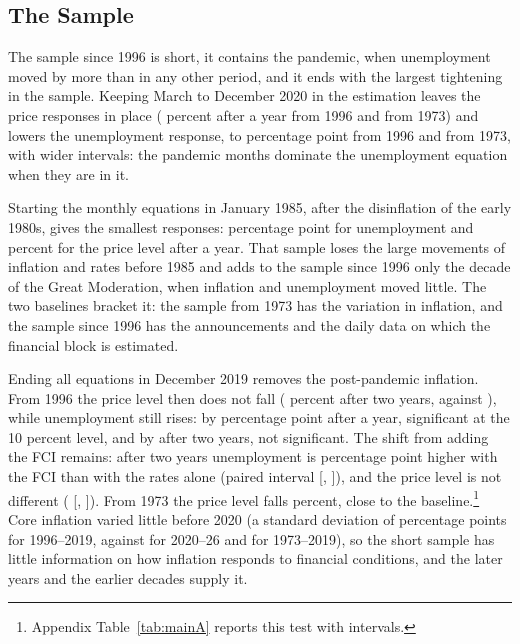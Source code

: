 \documentclass[11pt]{article}
\begin{document}
\subsection{The Sample}\label{sec:recent}
The sample since 1996 is short, it contains the pandemic, when unemployment moved by more than in any other period, and it ends with the largest tightening in the sample. Keeping March to December 2020 in the estimation leaves the price responses in place ( percent after a year from 1996 and  from 1973) and lowers the unemployment response, to  percentage point from 1996 and  from 1973, with wider intervals: the pandemic months dominate the unemployment equation when they are in it.

Starting the monthly equations in January 1985, after the disinflation of the early 1980s, gives the smallest responses:  percentage point for unemployment and  percent for the price level after a year. That sample loses the large movements of inflation and rates before 1985 and adds to the sample since 1996 only the decade of the Great Moderation, when inflation and unemployment moved little. The two baselines bracket it: the sample from 1973 has the variation in inflation, and the sample since 1996 has the announcements and the daily data on which the financial block is estimated.

Ending all equations in December 2019 removes the post-pandemic inflation. From 1996 the price level then does not fall ( percent after two years, against ), while unemployment still rises: by  percentage point after a year, significant at the 10 percent level, and by  after two years, not significant. The shift from adding the FCI remains: after two years unemployment is  percentage point higher with the FCI than with the rates alone (paired interval [, ]), and the price level is not different ( [, ]). From 1973 the price level falls  percent, close to the baseline.\footnote{Appendix Table~\ref{tab:mainA} reports this test with intervals.} Core inflation varied little before 2020 (a standard deviation of  percentage points for 1996--2019, against  for 2020--26 and  for 1973--2019), so the short sample has little information on how inflation responds to financial conditions, and the later years and the earlier decades supply it.
\end{document}
